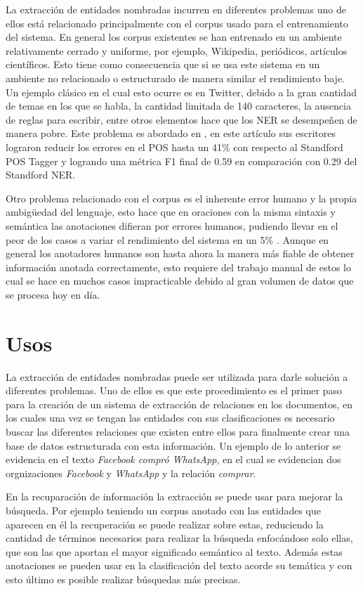 \documentclass[runningheads]{llncs}
\begin{document}
La extracción de entidades nombradas incurren en diferentes problemas uno de ellos está relacionado principalmente con el corpus usado para el entrenamiento del sistema. En general los corpus existentes se han entrenado en un ambiente relativamente cerrado y uniforme, por ejemplo, Wikipedia, periódicos, artículos científicos. Esto tiene como consecuencia que si se usa este sistema en un ambiente no relacionado o estructurado de manera similar el rendimiento baje. Un ejemplo clásico en el cual esto ocurre es en Twitter, debido a la gran cantidad de temas en los que se habla, la cantidad limitada de 140 caracteres, la ausencia de reglas para escribir,  entre otros elementos hace que los NER se desempeñen de manera pobre. Este problema es abordado en \cite{tweeter}, en este artículo sus escritores lograron reducir los errores en el POS hasta un 41\% con respecto al Standford POS Tagger y logrando una métrica F1 final de 0.59 en comparación con 0.29 del Standford NER.

Otro problema relacionado con el corpus es el inherente error humano y la propia ambigüedad del lenguaje, esto hace que en oraciones con la misma sintaxis y semántica las anotaciones difieran por errores humanos, pudiendo llevar en el peor de los casos a variar el rendimiento del sistema en un 5\% \cite{posdecisiontree}. Aunque en general los anotadores humanos son hasta ahora la manera más fiable de obtener información anotada correctamente, esto requiere del trabajo manual de estos lo cual se hace en muchos casos impracticable debido al gran volumen de datos que se procesa hoy en día.

\section{Usos}

La extracción de entidades nombradas puede ser utilizada para darle solución a diferentes problemas. Uno de ellos es que este procedimiento es el primer paso para la creación de un sistema de extracción de relaciones en los documentos, en los cuales una vez se tengan las entidades con sus clasificaciones es necesario buscar las diferentes relaciones que existen entre ellos para finalmente crear una base de datos estructurada con esta información. Un ejemplo de lo anterior se evidencia en el texto \emph{Facebook compró WhatsApp}, en el cual se evidencian dos orgnizaciones \emph{Facebook} y \emph{WhatsApp} y la relación \emph{comprar}.

En la recuparación de información la extracción se puede usar para mejorar la búsqueda. Por ejemplo teniendo un corpus anotado con las entidades que aparecen en él la recuperación se puede realizar sobre estas, reduciendo la cantidad de términos necesarios para realizar la búsqueda enfocándose solo ellas, que son las que aportan el mayor significado semántico al texto. Además estas anotaciones se pueden usar en la clasificación del texto acorde su temática y con esto último es posible realizar búsquedas más precisas.
\end{document}
